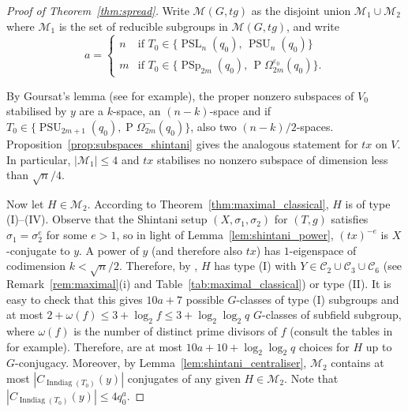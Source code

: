 \documentclass[11pt]{article}
\numberwithin{equation}{section}
\theoremstyle{shdefinition}
\theoremstyle{shplain}
\newcommand{\e}{\varepsilon}
\newcommand{\s}{\sigma}
\newcommand{\C}{\mathcal{C}}
\newcommand{\M}{\mathcal{M}}
\newcommand{\<}{\langle}
\renewcommand{\>}{\rangle}
\renewcommand{\leq}{\leqslant}
\newcommand{\Inndiag}{\operatorname{Inndiag}}
\renewcommand{\:}{\colon}
\newcommand{\PSL}{\operatorname{PSL}}
\newcommand{\PSp}{\operatorname{PSp}}
\newcommand{\PSU}{\operatorname{PSU}}
\newcommand{\Om}{\Omega}
\newcommand{\POm}{\operatorname{P}\!\Om}
\begin{document}
\begin{proof}[Proof of Theorem~\ref{thm:spread}]
Write $\M(G,tg)$ as the disjoint union $\M_1 \cup \M_2$ where $\M_1$ is the set of reducible subgroups in $\M(G,tg)$, and write
\[
a = \left\{ 
\begin{array}{ll}
n & \text{if $T_0 \in \{ \PSL_n(q_0),\, \PSU_n(q_0)\}$} \\
m & \text{if $T_0 \in \{ \PSp_{2m}(q_0),\, \POm^{\e_0}_{2m}(q_0) \}$.}
\end{array}
\right.
\] 

By Goursat's lemma (see \cite[Lemma~2.3.1]{ref:Harper} for example), the proper nonzero subspaces of $V_0$ stabilised by $y$ are a $k$-space, an $(n-k)$-space and if $T_0 \in \{ \PSU_{2m+1}(q_0), \POm^-_{2m}(q_0)\}$, also two $(n-k)/2$-spaces. Proposition~\ref{prop:subspaces_shintani} gives the analogous statement for $tx$ on $V$. In particular, $|\M_1| \leq 4$ and $tx$ stabilises no nonzero subspace of dimension less than $\sqrt{n}/4$.

Now let $H \in \M_2$. According to Theorem~\ref{thm:maximal_classical}, $H$ is of type (I)--(IV). Observe that the Shintani setup $(X,\s_1,\s_2)$ for $(T,g)$ satisfies $\s_1 = \s_2^e$ for some $e > 1$, so in light of Lemma~\ref{lem:shintani_power}, $(tx)^{-e}$ is $X$-conjugate to $y$. A power of $y$ (and therefore also $tx$) has $1$-eigenspace of codimension $k < \sqrt{n}/2$. Therefore, by \cite[Theorem~7.1]{ref:GuralnickSaxl03}, $H$ has type (I) with $Y \in \C_2 \cup \C_3 \cup \C_6$ (see Remark~\ref{rem:maximal}(i) and Table~\ref{tab:maximal_classical}) or type (II). It is easy to check that this gives $10a+7$ possible $G$-classes of type (I) subgroups and at most $2+\omega(f) \leq 3 + \log_2{f} \leq 3 + \log_2\log_2{q}$ $G$-classes of subfield subgroup, where $\omega(f)$ is the number of distinct prime divisors of $f$ (consult the tables in \cite[Chapter~3]{ref:KleidmanLiebeck} for example). Therefore, are at most $10a+10+\log_2\log_2{q}$ choices for $H$ up to $G$-conjugacy. Moreover, by Lemma~\ref{lem:shintani_centraliser}, $\M_2$ contains at most $|C_{\Inndiag(T_0)}(y)|$ conjugates of any given $H \in \M_2$. Note that $|C_{\Inndiag(T_0)}(y)| \leq 4q_0^a$.


\end{proof}
\end{document}
